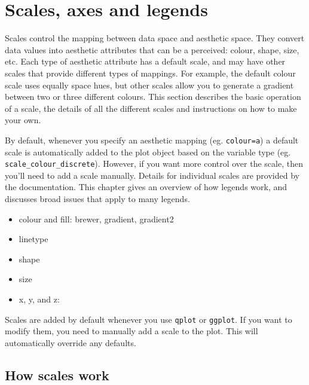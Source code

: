 
\chapter{Scales, axes and legends}

Scales control the mapping between data space and aesthetic space.  They convert data values into aesthetic attributes that can be a perceived: colour, shape, size, etc.  Each type of aesthetic attribute has a default scale, and may have other scales that provide different types of mappings.  For example, the default colour scale uses equally space hues, but other scales allow you to generate a gradient between two or three different colours.  This section describes the basic operation of a scale, the details of all the different scales and instructions on how to make your own.

By default, whenever you specify an aesthetic mapping (eg. {\tt colour=a}) a default scale is automatically added to the plot object based on the variable type (eg. \verb|scale_colour_discrete|).  However, if you want more control over the scale, then you'll need to add a scale manually.  Details for individual scales are provided by the documentation.  This chapter gives an overview of how legends work, and discusses broad issues that apply to many legends.

\begin{itemize}
	\item colour and fill: brewer, gradient, gradient2
	\item linetype
	\item shape
	\item size
	\item x, y, and z: 
\end{itemize}

Scales are added by default whenever you use {\tt qplot} or {\tt ggplot}.  If you want to modify them, you need to manually add a scale to the plot.  This will automatically override any defaults.

\section{How scales work}

